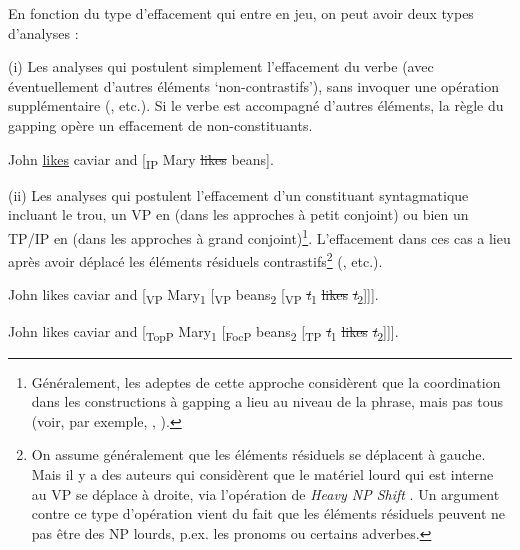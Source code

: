 En fonction du type d’effacement qui entre en jeu, on peut avoir deux types d’analyses :

\noindent (i) Les analyses qui postulent simplement l’effacement du verbe (avec éventuellement d’autres éléments ‘non-contrastifs’), sans invoquer une opération supplémentaire (\citealt{Ross1967,Ross1970,Jackendoff1971,Hankamer1973,Hankamer1979,Stillings1975,Kuno1976,Neijt1979,vanOirsouw1987,Wilder1994,Wilder1997,Hartmann2000,FeryEtAl2005}, etc.). Si le verbe est accompagné d’autres éléments, la règle du gapping opère un effacement de non-constituants.

\ea
John \uline{likes} caviar and [\textsubscript{IP} Mary \st{likes} beans].       
\z

\noindent (ii) Les analyses qui postulent l’effacement d’un constituant syntagmatique incluant le trou, {\cad} un VP en  (dans les approches à petit conjoint) ou bien un TP/IP en  (dans les approches à grand conjoint)\footnote{
 Généralement, les adeptes de cette approche considèrent que la coordination dans les constructions à gapping a lieu au niveau de la phrase, mais pas tous (voir, par exemple, \citealt{Coppock2001}, \citealt{Lin2002}).}. L’effacement dans ces cas a lieu après avoir déplacé les éléments résiduels contrastifs\footnote{
 On assume généralement que les éléments résiduels se déplacent à gauche. Mais il y a des auteurs qui considèrent que le matériel lourd qui est interne au VP se déplace à droite, via l’opération de \textit{Heavy NP Shift} \citep{Jayaseelan1990,Kim1997,Kim2006}. Un argument contre ce type d’opération vient du fait que les éléments résiduels peuvent ne pas être des NP lourds, p.ex. les pronoms ou certains adverbes.}  (\citealt{Sag1976,Jayaseelan1990,Kim1997,Kim1998,Kim2006,Coppock2001,Lin2002,KonietzkoEtAl2010,MolnarEtAl2010}, etc.).

\ea
\ea John likes caviar and [\textsubscript{VP} Mary\textsubscript{1} [\textsubscript{VP} beans\textsubscript{2} [\textsubscript{VP} \st{\textit{t}}\textsubscript{1} \st{likes} \st{\textit{t}}\textsubscript{2}]]]. \citep{Coppock2001} \label{ch2:ex200a} %

\ex John likes caviar and [\textsubscript{TopP} Mary\textsubscript{1} [\textsubscript{FocP} beans\textsubscript{2} [\textsubscript{TP} \st{\textit{t}}\textsubscript{1} \st{likes} \st{\textit{t}}\textsubscript{2}]]]. \label{ch2:ex200b} %
\z
\z

